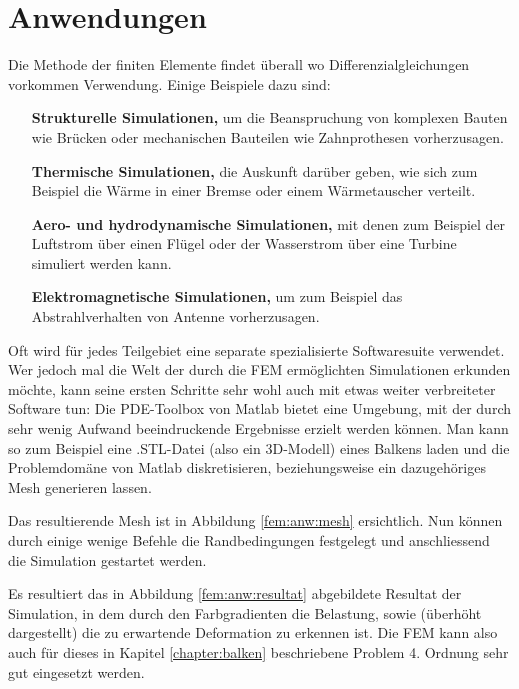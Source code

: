 %
%
%
%
\section{Anwendungen\label{fem:section:anwendungen}}

Die Methode der finiten Elemente findet überall wo Differenzialgleichungen vorkommen Verwendung.
Einige Beispiele dazu sind:
\begin{itemize}
    \item [\textbf{Strukturelle Simulationen,}] um die Beanspruchung von komplexen Bauten wie Brücken oder mechanischen Bauteilen wie Zahnprothesen vorherzusagen.
    \item [\textbf{Thermische Simulationen,}] die Auskunft darüber geben, wie sich zum Beispiel die Wärme in einer Bremse oder einem Wärmetauscher verteilt.
    \item [\textbf{Aero- und hydrodynamische Simulationen,}] mit denen zum Beispiel der Luftstrom über einen Flügel oder der Wasserstrom über eine Turbine simuliert werden kann.
    \item [\textbf{Elektromagnetische Simulationen,}] um zum Beispiel das Abstrahlverhalten von Antenne vorherzusagen.
\end{itemize}

Oft wird für jedes Teilgebiet eine separate spezialisierte Softwaresuite verwendet.
Wer jedoch mal die Welt der durch die FEM ermöglichten Simulationen erkunden möchte, kann seine ersten Schritte sehr wohl auch mit etwas weiter verbreiteter Software tun: 
Die PDE-Toolbox von Matlab bietet eine Umgebung, mit der durch sehr wenig Aufwand beeindruckende Ergebnisse erzielt werden können.
Man kann so zum Beispiel eine .STL-Datei (also ein 3D-Modell) eines Balkens laden und die Problemdomäne von Matlab diskretisieren, beziehungsweise ein dazugehöriges Mesh generieren lassen. 

Das resultierende Mesh ist in Abbildung \ref{fem:anw:mesh} ersichtlich.
Nun können durch einige wenige Befehle die Randbedingungen festgelegt und anschliessend die Simulation gestartet werden.

Es resultiert das in Abbildung \ref{fem:anw:resultat} abgebildete Resultat der Simulation, in dem durch den Farbgradienten die Belastung, sowie (überhöht dargestellt) die zu erwartende Deformation zu erkennen ist.
Die FEM kann also auch für dieses in Kapitel \ref{chapter:balken} beschriebene Problem 4. Ordnung sehr gut eingesetzt werden.